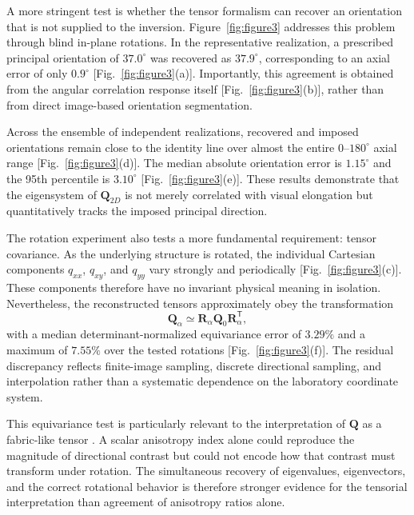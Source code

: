 \documentclass{article}
\begin{document}
A more stringent test is whether the tensor formalism can recover an orientation that is not supplied to the inversion. Figure~\ref{fig:figure3} addresses this problem through blind in-plane rotations. In the representative realization, a prescribed principal orientation of $37.0^{\circ}$ was recovered as $37.9^{\circ}$, corresponding to an axial error of only $0.9^{\circ}$ [Fig.~\ref{fig:figure3}(a)]. Importantly, this agreement is obtained from the angular correlation response itself [Fig.~\ref{fig:figure3}(b)], rather than from direct image-based orientation segmentation.

Across the ensemble of independent realizations, recovered and imposed orientations remain close to the identity line over almost the entire $0$--$180^{\circ}$ axial range [Fig.~\ref{fig:figure3}(d)]. The median absolute orientation error is $1.15^{\circ}$ and the 95th percentile is $3.10^{\circ}$ [Fig.~\ref{fig:figure3}(e)]. These results demonstrate that the eigensystem of $\mathbf{Q}_{2D}$ is not merely correlated with visual elongation but quantitatively tracks the imposed principal direction.

The rotation experiment also tests a more fundamental requirement: tensor covariance. As the underlying structure is rotated, the individual Cartesian components $q_{xx}$, $q_{xy}$, and $q_{yy}$ vary strongly and periodically [Fig.~\ref{fig:figure3}(c)]. These components therefore have no invariant physical meaning in isolation. Nevertheless, the reconstructed tensors approximately obey the transformation
%
\begin{equation}
    \mathbf{Q}_{\alpha}
    \simeq
    \mathbf{R}_{\alpha}
    \mathbf{Q}_{0}
    \mathbf{R}_{\alpha}^{\mathsf T},
    \label{eq:rotation_equivariance}
\end{equation}
%
with a median determinant-normalized equivariance error of $3.29\%$ and a maximum of $7.55\%$ over the tested rotations [Fig.~\ref{fig:figure3}(f)]. The residual discrepancy reflects finite-image sampling, discrete directional sampling, and interpolation rather than a systematic dependence on the laboratory coordinate system.

This equivariance test is particularly relevant to the interpretation of $\mathbf{Q}$ as a fabric-like tensor \cite{Cowin2004,Inglis2003}. A scalar anisotropy index alone could reproduce the magnitude of directional contrast but could not encode how that contrast must transform under rotation. The simultaneous recovery of eigenvalues, eigenvectors, and the correct rotational behavior is therefore stronger evidence for the tensorial interpretation than agreement of anisotropy ratios alone.
\end{document}
